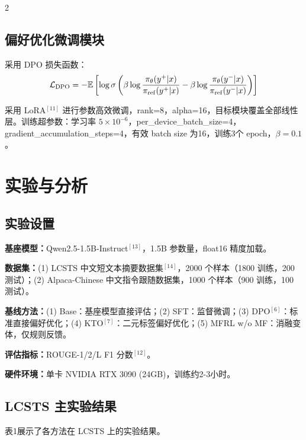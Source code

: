 \documentclass{aas}
\begin{document}
\begin{multicols}{2}
\subsection{偏好优化微调模块}

采用 DPO 损失函数：
\begin{equation}
    \mathcal{L}_{\rm DPO} = -\mathbb{E}\left[\log \sigma\left(\beta \log \frac{\pi_\theta(y^+|x)}{\pi_{\rm ref}(y^+|x)} - \beta \log \frac{\pi_\theta(y^-|x)}{\pi_{\rm ref}(y^-|x)}\right)\right]
\end{equation}

采用 LoRA$^{[11]}$ 进行参数高效微调，rank=8，alpha=16，目标模块覆盖全部线性层。训练超参数：学习率 $5\times10^{-6}$，per\_device\_batch\_size=4，gradient\_accumulation\_steps=4，有效 batch size 为16，训练3个 epoch，$\beta=0.1$。

\section{实验与分析}

\subsection{实验设置}

\textbf{基座模型：}Qwen2.5-1.5B-Instruct$^{[13]}$，1.5B 参数量，float16 精度加载。

\textbf{数据集：}(1) LCSTS 中文短文本摘要数据集$^{[14]}$，2000 个样本（1800 训练，200 测试）；(2) Alpaca-Chinese 中文指令跟随数据集，1000 个样本（900 训练，100 测试）。

\textbf{基线方法：}(1) Base：基座模型直接评估；(2) SFT：监督微调；(3) DPO$^{[6]}$：标准直接偏好优化；(4) KTO$^{[7]}$：二元标签偏好优化；(5) MFRL w/o MF：消融变体，仅规则反馈。

\textbf{评估指标：}ROUGE-1/2/L F1 分数$^{[12]}$。

\textbf{硬件环境：}单卡 NVIDIA RTX 3090 (24GB)，训练约2-3小时。

\subsection{LCSTS 主实验结果}

表1展示了各方法在 LCSTS 上的实验结果。


\end{multicols}
\end{document}
